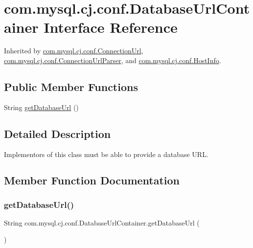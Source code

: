 \hypertarget{interfacecom_1_1mysql_1_1cj_1_1conf_1_1_database_url_container}{}\section{com.\+mysql.\+cj.\+conf.\+Database\+Url\+Container Interface Reference}
\label{interfacecom_1_1mysql_1_1cj_1_1conf_1_1_database_url_container}


Inherited by \mbox{\hyperlink{classcom_1_1mysql_1_1cj_1_1conf_1_1_connection_url}{com.\+mysql.\+cj.\+conf.\+Connection\+Url}}, \mbox{\hyperlink{classcom_1_1mysql_1_1cj_1_1conf_1_1_connection_url_parser}{com.\+mysql.\+cj.\+conf.\+Connection\+Url\+Parser}}, and \mbox{\hyperlink{classcom_1_1mysql_1_1cj_1_1conf_1_1_host_info}{com.\+mysql.\+cj.\+conf.\+Host\+Info}}.

\subsection*{Public Member Functions}
\begin{DoxyCompactItemize}
\item 
String \mbox{\hyperlink{interfacecom_1_1mysql_1_1cj_1_1conf_1_1_database_url_container_a5a2570fc547da50c4d8f0486de2fb13e}{get\+Database\+Url}} ()
\end{DoxyCompactItemize}


\subsection{Detailed Description}
Implementors of this class must be able to provide a database U\+RL. 

\subsection{Member Function Documentation}
\mbox{\label{interfacecom_1_1mysql_1_1cj_1_1conf_1_1_database_url_container_a5a2570fc547da50c4d8f0486de2fb13e}} 
\subsubsection{\texorpdfstring{get\+Database\+Url()}{getDatabaseUrl()}}
{\footnotesize\ttfamily String com.\+mysql.\+cj.\+conf.\+Database\+Url\+Container.\+get\+Database\+Url (\begin{DoxyParamCaption}{ }\end{DoxyParamCaption})}


